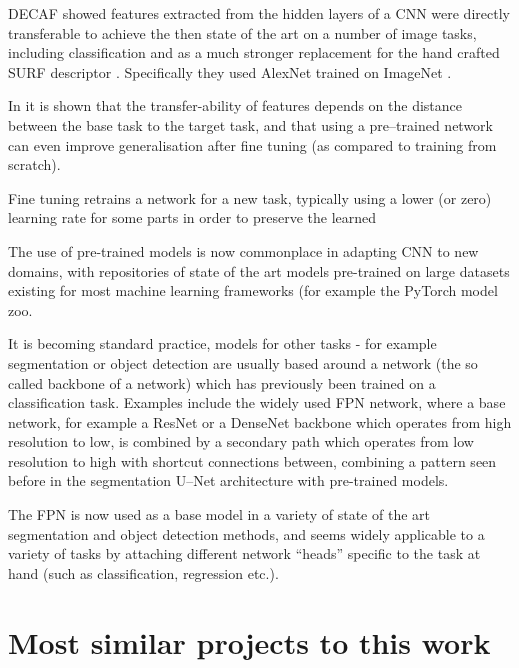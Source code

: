 \gls{DECAF} \cite{Donahue2014} showed features extracted from the hidden layers of a \gls{CNN} were directly transferable to achieve the then state of the art on a number of image tasks, including classification and as a much stronger replacement for the hand crafted \gls{SURF} descriptor \cite{bay2006surf}.  Specifically they used AlexNet  \cite{Krizhevsky2012} trained on ImageNet \cite{JiaDeng2009}.

In \cite{Yosinski} it is shown that the transfer-ability of features depends on the distance between the base task to the target task, and that using a pre--trained network can even improve generalisation after fine tuning (as compared to training from scratch).

Fine tuning retrains a network for a new task, typically using a lower (or zero) learning rate for some parts in order to preserve the learned 

The use of pre-trained models is now commonplace in adapting \gls{CNN} to new domains, with repositories of state of the art models pre-trained on large datasets existing for most machine learning frameworks (for example the PyTorch \cite{Paszke2017} model zoo. 

It is becoming standard practice, models for other tasks - for example segmentation or object detection are usually based around a network (the so called backbone of a network) which has previously been trained on a classification task. Examples include the widely used \gls{FPN} network, \cite{Lin2017a} where a base network, for example a ResNet \cite{He} or a DenseNet \cite{Huang2016} backbone which operates from high resolution to low, is combined by a secondary path which operates from low resolution to high with shortcut connections between, combining a pattern seen before in the segmentation U--Net \cite{Ronneberger2015a} architecture with pre-trained models.

The \gls{FPN} is now used as a base model in a variety of state of the art segmentation and object detection methods, and seems widely applicable to a variety of tasks by attaching different network ``heads'' specific to the task at hand (such as classification, regression etc.).






\section {Most similar projects to this work}
\label{sec:closest}

